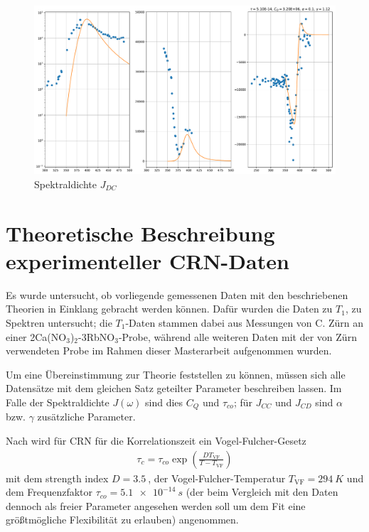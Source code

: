 \begin{figure}
	\begin{center}
		\includegraphics[width=\textwidth]{graphics/plots/THEO/J_dc_01.pdf}
	\end{center}
	\caption{Spektraldichte $J_{DC}$} \label{fig:res:theorie_j_dc}
\end{figure}



\section{Theoretische Beschreibung experimenteller CRN-Daten} \label{section:theo:daten}


Es wurde untersucht, ob vorliegende gemessenen Daten mit den beschriebenen Theorien in Einklang gebracht werden können. Dafür wurden die Daten zu $T_1$, zu Spektren untersucht; die $T_1$-Daten stammen dabei aus Messungen von C. Zürn \cite{zuern_paper} an einer 2Ca(NO$_3$)$_2$-3RbNO$_3$-Probe, während alle weiteren Daten mit der von Zürn verwendeten Probe im Rahmen dieser Masterarbeit aufgenommen wurden.

Um eine Übereinstimmung zur Theorie feststellen zu können, müssen sich alle Datensätze mit dem gleichen Satz geteilter Parameter beschreiben lassen. Im Falle der Spektraldichte $J(\omega)$ sind dies $C_Q$ und $\tau_{co}$; für $J_{CC}$ und $J_{CD}$ sind $\alpha$ bzw. $\gamma$ zusätzliche Parameter.

Nach \cite{PIMENOV199793} wird für CRN für die Korrelationszeit ein Vogel-Fulcher-Gesetz
\begin{align}
	\tau_c = \tau_{co} \exp \left( \frac{D T_\text{VF}}{T-T_\text{VF}} \right) 
\end{align}
mit dem strength index $D = \SI{3.5}{}$, der Vogel-Fulcher-Temperatur $T_\text{VF} = \SI{294}{K}$ und dem Frequenzfaktor $\tau_{co} = \SI{5.1e-14}{s}$ (der beim Vergleich mit den Daten dennoch als freier Parameter angesehen werden soll um dem Fit eine größtmögliche Flexibilität zu erlauben) angenommen.

